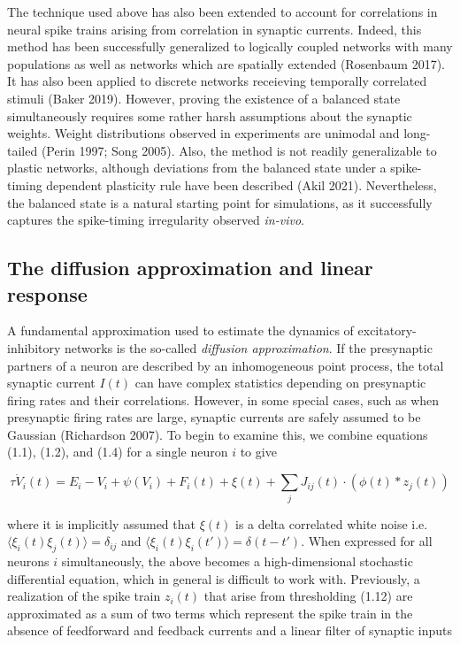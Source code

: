 \documentclass{ucetd}
\begin{document}
The technique used above has also been extended to account for correlations in neural spike trains arising from correlation in synaptic currents. Indeed, this method has been successfully generalized to logically coupled networks with many populations as well as networks which are spatially extended (Rosenbaum 2017). It has also been applied to discrete networks receieving temporally correlated stimuli (Baker 2019). However, proving the existence of a balanced state simultaneously requires some rather harsh assumptions about the synaptic weights. Weight distributions observed in experiments are unimodal and long-tailed (Perin 1997; Song 2005). Also, the method is not readily generalizable to plastic networks, although deviations from the balanced state under a spike-timing dependent plasticity rule have been described (Akil 2021). Nevertheless, the balanced state is a natural starting point for simulations, as it successfully captures the spike-timing irregularity observed \emph{in-vivo}.

\subsection{The diffusion approximation and linear response}


A fundamental approximation used to estimate the dynamics of excitatory-inhibitory networks is the so-called \emph{diffusion approximation}. If the presynaptic partners of a neuron are described by an inhomogeneous point process, the total synaptic current $I(t)$ can have complex statistics depending on presynaptic firing rates and their correlations. However, in some special cases, such as when presynaptic firing rates are large, synaptic currents are safely assumed to be Gaussian (Richardson 2007). To begin to examine this, we combine equations (1.1), (1.2), and (1.4) for a single neuron $i$ to give 

\begin{equation}
\tau\dot{V}_{i}(t) = E_{i} - V_{i} + \psi(V_{i}) + F_{i}(t) + \xi(t) + \sum_{j} J_{ij}(t)\cdot \left(\phi(t) * z_{j}(t)\right)
\end{equation}

where it is implicitly assumed that $\xi(t)$ is a delta correlated white noise i.e. $\langle\xi_{i}(t)\xi_{j}(t)\rangle = \delta_{ij}$ and $\langle\xi_{i}(t)\xi_{i}(t')\rangle = \delta(t-t')$. When expressed for all neurons $i$ simultaneously, the above becomes a high-dimensional stochastic differential equation, which in general is difficult to work with. Previously, a realization of the spike train $z_{i}(t)$ that arise from thresholding (1.12) are approximated as a sum of two terms which represent the spike train in the absence of feedforward and feedback currents and a linear filter of synaptic inputs
\end{document}
